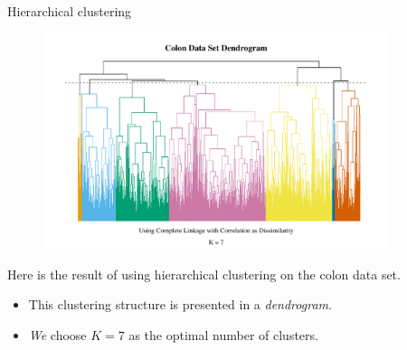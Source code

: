 \documentclass[8pt]{beamer}
\begin{document}
\begin{frame}{\color{white} Hierarchical clustering}

\begin{figure}
    \centering
    \includegraphics[width = 0.9\textwidth]{colon_den.pdf}
\end{figure}

Here is the result of using hierarchical clustering on the colon data set.
\begin{itemize}
    \item This clustering structure is presented in a \textit{dendrogram}.
    \item \textit{We} choose $K = 7$ as the optimal number of clusters.
\end{itemize}
    
\end{frame}
\end{document}
